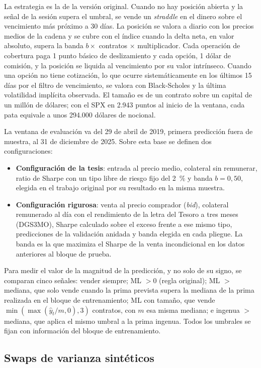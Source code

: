 \documentclass[11pt,a4paper]{article}
\begin{document}
La estrategia es la de la versión original. Cuando no hay posición abierta y la señal de la sesión supera el umbral, se vende un \textit{straddle} en el dinero sobre el vencimiento más próximo a 30 días. La posición se valora a diario con los precios medios de la cadena y se cubre con el índice cuando la delta neta, en valor absoluto, supera la banda $b\times$ contratos $\times$ multiplicador. Cada operación de cobertura paga 1 punto básico de deslizamiento y cada opción, 1 dólar de comisión, y la posición se liquida al vencimiento por su valor intrínseco. Cuando una opción no tiene cotización, lo que ocurre sistemáticamente en los últimos 15 días por el filtro de vencimiento, se valora con Black-Scholes \citep{blackscholes1973,merton1973} y la última volatilidad implícita observada. El tamaño es de un contrato sobre un capital de un millón de dólares; con el SPX en 2.943 puntos al inicio de la ventana, cada pata equivale a unos 294.000 dólares de nocional.

La ventana de evaluación va del 29 de abril de 2019, primera predicción fuera de muestra, al 31 de diciembre de 2025. Sobre esta base se definen dos configuraciones:
\begin{itemize}
  \item \textbf{Configuración de la tesis}: entrada al precio medio, colateral sin remunerar, ratio de Sharpe con un tipo libre de riesgo fijo del 2~\% y banda $b=0{,}50$, elegida en el trabajo original por su resultado en la misma muestra.
  \item \textbf{Configuración rigurosa}: venta al precio comprador (\textit{bid}), colateral remunerado al día con el rendimiento de la letra del Tesoro a tres meses (DGS3MO), Sharpe calculado sobre el exceso frente a ese mismo tipo, predicciones de la validación anidada y banda elegida en cada pliegue. La banda es la que maximiza el Sharpe de la venta incondicional en los datos anteriores al bloque de prueba.
\end{itemize}
Para medir el valor de la magnitud de la predicción, y no solo de su signo, se comparan cinco señales: vender siempre; ML $>0$ (regla original); ML $>$ mediana, que solo vende cuando la prima prevista supera la mediana de la prima realizada en el bloque de entrenamiento; ML con tamaño, que vende $\min(\max(\hat y_t/m,0),3)$ contratos, con $m$ esa misma mediana; e ingenua $>$ mediana, que aplica el mismo umbral a la prima ingenua. Todos los umbrales se fijan con información del bloque de entrenamiento.

\subsection{Swaps de varianza sintéticos}\label{sec:metodo_vs}
\end{document}
